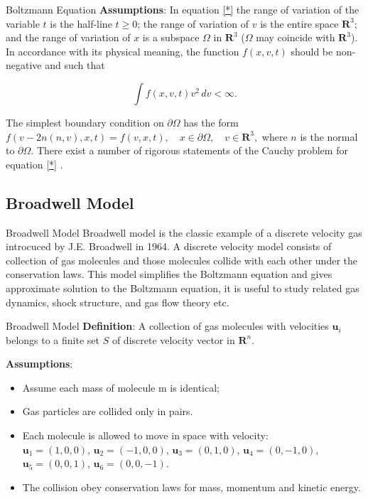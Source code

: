 \documentclass[12pt,xcolor={table,dvipsnames},t]{beamer}
\begin{document}
\begin{frame}{Boltzmann Equation}
\textbf{Assumptions}:
In equation \eqref{*} the range of variation of the variable $t$ is the half-line $t\geq0$; the range of variation of $v$ is the entire space $\mathbf R^3$; and the range of variation of $x$ is a subspace $\Omega$ in $\mathbf R^3$ ($\Omega$ may coincide with $\mathbf R^3$). In accordance with its physical meaning, the function $f(x,v,t)$ should be non-negative and such that

$$\int f(x,v,t)v^2\,dv<\infty.$$

The simplest boundary condition on $\partial\Omega$ has the form $f(v-2n(n,v),x,t)=f(v,x,t),\quad x\in\partial\Omega,\quad v\in\mathbf R^3,$
where $n$ is the normal to $\partial\Omega$. 
There exist a number of rigorous statements of the Cauchy problem for equation \eqref{*} .
\end{frame}

\subsection{Broadwell Model}
\begin{frame}{Broadwell Model}
Broadwell model is the classic example of a discrete velocity gas introcuced by J.E. Broadwell in 1964. A discrete velocity model consists of collection of gas molecules and those molecules collide with each other under the conservation laws. This model simplifies the Boltzmann equation and gives approximate solution to the Boltzmann equation, it is useful to study related gas dynamics, shock structure, and gas flow theory etc.
\end{frame}


\begin{frame}{Broadwell Model}
\textbf{Definition}: A collection of gas molecules with velocities $ \mathbf {u}_i$ belongs to a finite set $S$ of discrete velocity vector in $\mathbf{R}^n$. 

\textbf{Assumptions}: 
\begin{itemize}
  \item Assume each mass of molecule m is identical;
  \item Gas particles are collided only in pairs.
  \item Each molecule is allowed to move in space with velocity:\\
  $  \mathbf u _ {1} = ( 1,0,0 ) $, 
$  \mathbf u _ {2} = ( - 1,0,0 ) $, 
$  \mathbf u _ {3} = ( 0,1,0 ) $, 
$  \mathbf u _ {4} = ( 0, - 1,0 ) $, 
$  \mathbf u _ {5} = ( 0,0,1 ) $, 
$  \mathbf u _ {6} = ( 0,0, - 1 ) $.
  \item The collision obey conservation laws for mass, momentum and kinetic energy.
\end{itemize}
\end{frame}
\end{document}
